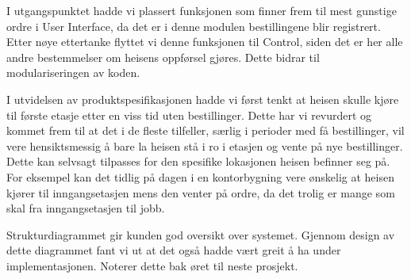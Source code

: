 \documentclass[language=norsk]{ezreport}
\begin{document}
I utgangspunktet hadde vi plassert funksjonen som finner frem til mest gunstige ordre i User Interface, da det er i denne modulen bestillingene blir registrert. Etter nøye ettertanke flyttet vi denne funksjonen til Control, siden det er her alle andre bestemmelser om heisens oppførsel gjøres. Dette bidrar til modulariseringen av koden.

I utvidelsen av produktspesifikasjonen hadde vi først tenkt at heisen skulle kjøre til første etasje etter en viss tid uten bestillinger. Dette har vi revurdert og kommet frem til at det i de fleste tilfeller, særlig i perioder med få bestillinger, vil vere hensiktsmessig å bare la heisen stå i ro i etasjen og vente på nye bestillinger. Dette kan selvsagt tilpasses for den spesifike lokasjonen heisen befinner seg på. For eksempel kan det tidlig på dagen i en kontorbygning vere ønskelig at heisen kjører til inngangsetasjen mens den venter på ordre, da det trolig er mange som skal fra inngangsetasjen til jobb. 

Strukturdiagrammet gir kunden god oversikt over systemet. Gjennom design av dette diagrammet fant vi ut at det også hadde vært greit å ha under implementasjonen. Noterer dette bak øret til neste prosjekt.

%
\end{document}
